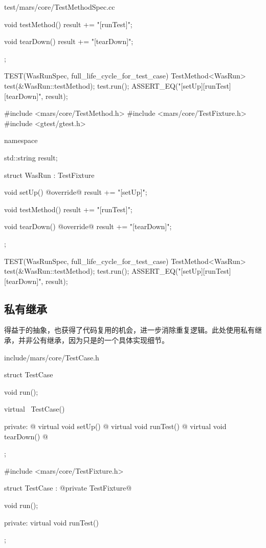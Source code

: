 \begin{content}
\begin{diff}{test/mars/core/TestMethodSpec.cc}
\begin{minicpp}
{{    void testMethod() {
      result += "[runTest]";
    }

    void tearDown() {
      result += "[tearDown]";
    }
  };
}

TEST(WasRunSpec, full_life_cycle_for_test_case) {
  TestMethod<WasRun> test(&WasRun::testMethod);
  test.run();
  ASSERT_EQ("[setUp][runTest][tearDown]", result);
}
\end{minicpp}
\tcblower
\begin{minicpp}
#include <mars/core/TestMethod.h>
#include <mars/core/TestFixture.h>
#include <gtest/gtest.h>

namespace {
  std::string result;

  struct WasRun : TestFixture {
    void setUp() @override@ {
      result += "[setUp]";
    }

    void testMethod() {
      result += "[runTest]";
    }

    void tearDown() @override@ {
      result += "[tearDown]";
    }
  };
}

TEST(WasRunSpec, full_life_cycle_for_test_case) {
  TestMethod<WasRun> test(&WasRun::testMethod);
  test.run();
  ASSERT_EQ("[setUp][runTest][tearDown]", result);
}
\end{minicpp}
\end{diff}

\subsection{私有继承}

得益于的抽象，也获得了代码复用的机会，进一步消除重复逻辑。此处使用私有继承，并非公有继承，因为只是的一个具体实现细节。

\begin{diff}{include/mars/core/TestCase.h}
 \begin{minicpp}
struct TestCase {
  void run();

  virtual ~TestCase() {}

private:
@  virtual void setUp() {}@
  virtual void runTest() {}
@  virtual void tearDown() {}@
};
  \end{minicpp}
\tcblower
 \begin{minicpp}
#include <mars/core/TestFixture.h>

struct TestCase : @private TestFixture@ {
  void run();

private:
  virtual void runTest() {}
};
  \end{minicpp}
\end{diff}


\end{content}
